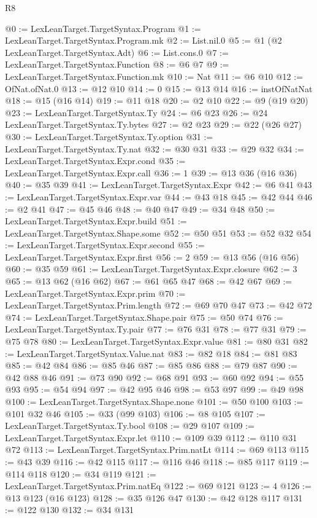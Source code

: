 \begin{lexlean}{R8}
\begin{coremodule}
@0 := LexLeanTarget.TargetSyntax.Program
@1 := LexLeanTarget.TargetSyntax.Program.mk
@2 := List.nil.{0}
@5 := @1 (@2 LexLeanTarget.TargetSyntax.Adt)
@6 := List.cons.{0}
@7 := LexLeanTarget.TargetSyntax.Function
@8 := @6 @7
@9 := LexLeanTarget.TargetSyntax.Function.mk
@10 := Nat
@11 := @6 @10
@12 := OfNat.ofNat.{0}
@13 := @12 @10
@14 := 0
@15 := @13 @14
@16 := instOfNatNat
@18 := @15 (@16 @14)
@19 := @11 @18
@20 := @2 @10
@22 := @9 (@19 @20)
@23 := LexLeanTarget.TargetSyntax.Ty
@24 := @6 @23
@26 := @24 LexLeanTarget.TargetSyntax.Ty.bytes
@27 := @2 @23
@29 := @22 (@26 @27)
@30 := LexLeanTarget.TargetSyntax.Ty.option
@31 := LexLeanTarget.TargetSyntax.Ty.nat
@32 := @30 @31
@33 := @29 @32
@34 := LexLeanTarget.TargetSyntax.Expr.cond
@35 := LexLeanTarget.TargetSyntax.Expr.call
@36 := 1
@39 := @13 @36 (@16 @36)
@40 := @35 @39
@41 := LexLeanTarget.TargetSyntax.Expr
@42 := @6 @41
@43 := LexLeanTarget.TargetSyntax.Expr.var
@44 := @43 @18
@45 := @42 @44
@46 := @2 @41
@47 := @45 @46
@48 := @40 @47
@49 := @34 @48
@50 := LexLeanTarget.TargetSyntax.Expr.build
@51 := LexLeanTarget.TargetSyntax.Shape.some
@52 := @50 @51
@53 := @52 @32
@54 := LexLeanTarget.TargetSyntax.Expr.second
@55 := LexLeanTarget.TargetSyntax.Expr.first
@56 := 2
@59 := @13 @56 (@16 @56)
@60 := @35 @59
@61 := LexLeanTarget.TargetSyntax.Expr.closure
@62 := 3
@65 := @13 @62 (@16 @62)
@67 := @61 @65 @47
@68 := @42 @67
@69 := LexLeanTarget.TargetSyntax.Expr.prim
@70 := LexLeanTarget.TargetSyntax.Prim.length
@72 := @69 @70 @47
@73 := @42 @72
@74 := LexLeanTarget.TargetSyntax.Shape.pair
@75 := @50 @74
@76 := LexLeanTarget.TargetSyntax.Ty.pair
@77 := @76 @31
@78 := @77 @31
@79 := @75 @78
@80 := LexLeanTarget.TargetSyntax.Expr.value
@81 := @80 @31
@82 := LexLeanTarget.TargetSyntax.Value.nat
@83 := @82 @18
@84 := @81 @83
@85 := @42 @84
@86 := @85 @46
@87 := @85 @86
@88 := @79 @87
@90 := @42 @88 @46
@91 := @73 @90
@92 := @68 @91
@93 := @60 @92
@94 := @55 @93
@95 := @54 @94
@97 := @42 @95 @46
@98 := @53 @97
@99 := @49 @98
@100 := LexLeanTarget.TargetSyntax.Shape.none
@101 := @50 @100
@103 := @101 @32 @46
@105 := @33 (@99 @103)
@106 := @8 @105
@107 := LexLeanTarget.TargetSyntax.Ty.bool
@108 := @29 @107
@109 := LexLeanTarget.TargetSyntax.Expr.let
@110 := @109 @39
@112 := @110 @31 @72
@113 := LexLeanTarget.TargetSyntax.Prim.natLt
@114 := @69 @113
@115 := @43 @39
@116 := @42 @115
@117 := @116 @46
@118 := @85 @117
@119 := @114 @118
@120 := @34 @119
@121 := LexLeanTarget.TargetSyntax.Prim.natEq
@122 := @69 @121
@123 := 4
@126 := @13 @123 (@16 @123)
@128 := @35 @126 @47
@130 := @42 @128 @117
@131 := @122 @130
@132 := @34 @131

\end{coremodule}
\end{lexlean}
